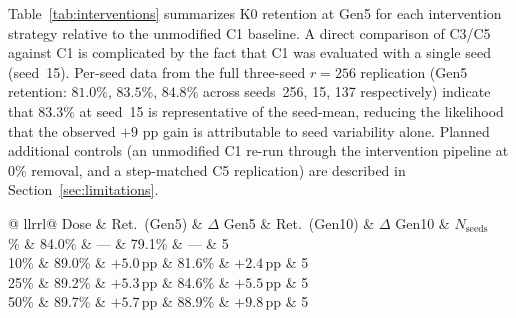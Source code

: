 \documentclass[a4paper,fleqn]{cas-dc}
\newif\ifshowchanges
\newcommand{\rev}[1]{\ifshowchanges{\color{blue}#1}\else{#1}\fi}
\begin{document}
Table~\ref{tab:interventions} summarizes K0 retention at Gen5 for each
intervention strategy relative to the unmodified C1 baseline.
A direct comparison of C3/C5 against C1 is complicated by the fact that C1
was evaluated with a single seed (seed~15). Per-seed data from the full
three-seed $r=256$ replication (Gen5 retention: $81.0\%$, $83.5\%$, $84.8\%$
across seeds~256, 15, 137 respectively) indicate that $83.3\%$ at seed~15 is
representative of the seed-mean, reducing the likelihood that the observed
$+9$ pp gain is attributable to seed variability alone. Planned additional
controls (an unmodified C1 re-run through the intervention pipeline at $0\%$
removal, and a step-matched C5 replication) are described in
Section~\ref{sec:limitations}. %

\begin{table}[width=.95\linewidth,cols=5,pos=htbp]
\caption{Synthetic-exposure interventions on Qwen $r=256$. C3: three seeds;
C5: three independent masks. Means reported for multi-seed/mask
conditions.}\label{tab:interventions}
\begin{tabular*}{\tblwidth}{@{} llrrl@{} }
\toprule
\rev{Dose & Ret.\ (Gen5) & $\Delta$ Gen5 & Ret.\ (Gen10) & $\Delta$ Gen10 & $N_\mathrm{seeds}$ \\
\midrule
0\%  & 84.0\% & ---             & 79.1\% & ---             & 5 \\
10\% & 89.0\% & $+5.0$\,pp      & 81.6\% & $+2.4$\,pp      & 5 \\
25\% & 89.2\% & $+5.3$\,pp      & 84.6\% & $+5.5$\,pp      & 5 \\
50\% & 89.7\% & $+5.7$\,pp      & 88.9\% & $+9.8$\,pp      & 5 \\}
\bottomrule
\end{tabular*}
\end{table}

\end{document}
